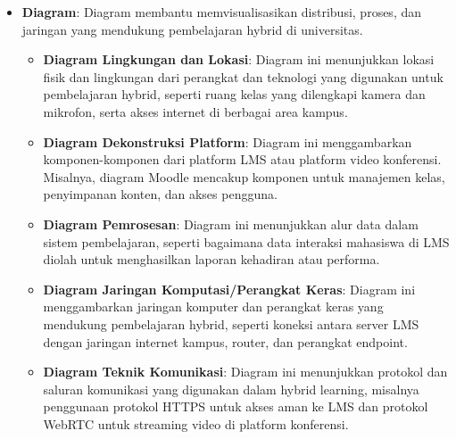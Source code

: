 \begin{itemize}
	\item \textbf{Diagram}: Diagram membantu memvisualisasikan distribusi, proses, dan jaringan yang mendukung pembelajaran hybrid di universitas.
	\begin{itemize}
		\item \textbf{Diagram Lingkungan dan Lokasi}: Diagram ini menunjukkan lokasi fisik dan lingkungan dari perangkat dan teknologi yang digunakan untuk pembelajaran hybrid, seperti ruang kelas yang dilengkapi kamera dan mikrofon, serta akses internet di berbagai area kampus.
		\item \textbf{Diagram Dekonstruksi Platform}: Diagram ini menggambarkan komponen-komponen dari platform LMS atau platform video konferensi. Misalnya, diagram Moodle mencakup komponen untuk manajemen kelas, penyimpanan konten, dan akses pengguna.
		\item \textbf{Diagram Pemrosesan}: Diagram ini menunjukkan alur data dalam sistem pembelajaran, seperti bagaimana data interaksi mahasiswa di LMS diolah untuk menghasilkan laporan kehadiran atau performa.
		\item \textbf{Diagram Jaringan Komputasi/Perangkat Keras}: Diagram ini menggambarkan jaringan komputer dan perangkat keras yang mendukung pembelajaran hybrid, seperti koneksi antara server LMS dengan jaringan internet kampus, router, dan perangkat endpoint.
		\item \textbf{Diagram Teknik Komunikasi}: Diagram ini menunjukkan protokol dan saluran komunikasi yang digunakan dalam hybrid learning, misalnya penggunaan protokol HTTPS untuk akses aman ke LMS dan protokol WebRTC untuk streaming video di platform konferensi.
	\end{itemize}
\end{itemize}



